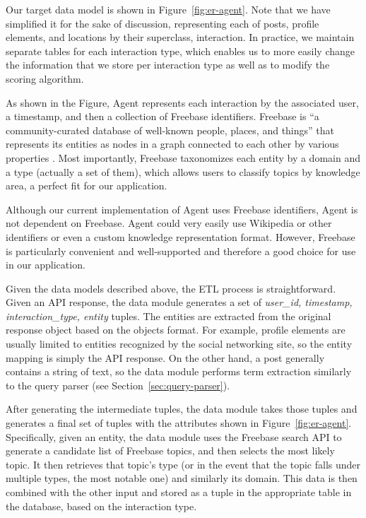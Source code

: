 Our target data model is shown in Figure~\ref{fig:er-agent}. Note that we have
simplified it for the sake of discussion, representing each of posts, profile
elements, and locations by their superclass, interaction. In practice, we
maintain separate tables for each interaction type, which enables us to more
easily change the information that we store per interaction type as well as to
modify the scoring algorithm.

As shown in the Figure, Agent represents each interaction by the associated
user, a timestamp, and then a collection of Freebase identifiers. Freebase is
``a community-curated database of well-known people, places, and things'' that
represents its entities as nodes in a graph connected to each other by various
properties \cite{freebase, freebase-api}. Most importantly, Freebase taxonomizes
each entity by a domain and a type (actually a set of them), which allows users
to classify topics by knowledge area, a perfect fit for our application.

Although our current implementation of Agent uses Freebase identifiers, Agent is
not dependent on Freebase. Agent could very easily use Wikipedia or
other identifiers or even a custom knowledge representation format. However,
Freebase is particularly convenient and well-supported and therefore a good
choice for use in our application.

Given the data models described above, the ETL process is straightforward. Given
an API response, the data module generates a set of {\it user\_id, timestamp,
interaction\_type, entity} tuples. The entities are extracted from the original
response object based on the objects format. For example, profile elements are
usually limited to entities recognized by the social networking site, so the
entity mapping is simply the API response. On the other hand, a post generally
contains a string of text, so the data module performs term extraction
similarly to the query parser (see Section~\ref{sec:query-parser}).

After generating the intermediate tuples, the data module takes those tuples and
generates a final set of tuples with the attributes shown in
Figure~\ref{fig:er-agent}. Specifically, given an entity, the data module uses
the Freebase search API to generate a candidate list of Freebase topics, and
then selects the most likely topic. It then retrieves that topic's type (or in
the event that the topic falls under multiple types, the most notable one) and
similarly its domain. This data is then combined with the other input and stored
as a tuple in the appropriate table in the database, based on the interaction
type.

